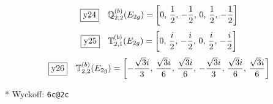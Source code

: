 \documentclass[fleqn,10pt,landscape]{jsarticle}
\begin{document}
\begin{dmath*}
\fbox{y24}\quad \mathbb{Q}_{2,2}^{(b)}(E_{2g})=\left[ 0,\, \frac{1}{2},\, - \frac{1}{2},\, 0,\, \frac{1}{2},\, - \frac{1}{2} \right]
\end{dmath*}
\begin{dmath*}
\fbox{y25}\quad \mathbb{T}_{2,1}^{(b)}(E_{2g})=\left[ 0,\, \frac{i}{2},\, - \frac{i}{2},\, 0,\, \frac{i}{2},\, - \frac{i}{2} \right]
\end{dmath*}
\begin{dmath*}
\fbox{y26}\quad \mathbb{T}_{2,2}^{(b)}(E_{2g})=\left[ - \frac{\sqrt{3} i}{3},\, \frac{\sqrt{3} i}{6},\, \frac{\sqrt{3} i}{6},\, - \frac{\sqrt{3} i}{3},\, \frac{\sqrt{3} i}{6},\, \frac{\sqrt{3} i}{6} \right]
\end{dmath*}
\vspace{5mm}

\noindent ** Wyckoff: \texttt{6c@2c}
\end{document}
